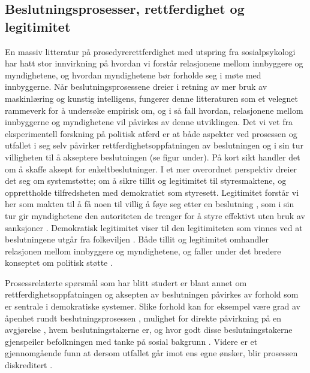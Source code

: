 \documentclass[
  12pt,
  a4paper, 12pt]{article}
\begin{document}
\hypertarget{beslutningsprosesser-rettferdighet-og-legitimitet}{%
\subsection{Beslutningsprosesser, rettferdighet og legitimitet}\label{beslutningsprosesser-rettferdighet-og-legitimitet}}

En massiv litteratur på prosedyrerettferdighet med utspring fra sosialpsykologi \citep{lind1988social} har hatt stor innvirkning på hvordan vi forstår relasjonene mellom innbyggere og myndighetene, og hvordan myndighetene bør forholde seg i møte med innbyggerne.
Når beslutningsprosessene dreier i retning av mer bruk av maskinlæring og kunstig intelligens, fungerer denne litteraturen som et velegnet rammeverk for å undersøke empirisk om, og i så fall hvordan, relasjonene mellom innbyggerne og myndighetene vil påvirkes av denne utviklingen.
Det vi vet fra eksperimentell forskning på politisk atferd er at både aspekter ved prosessen og utfallet i seg selv påvirker rettferdighetsoppfatningen av beslutningen og i sin tur villigheten til å akseptere beslutningen (se figur under).
På kort sikt handler det om å skaffe aksept for enkeltbeslutninger.
I et mer overordnet perspektiv dreier det seg om systemstøtte; om å sikre tillit og legitimitet til styresmaktene, og opprettholde tilfredsheten med demokratiet som styresett.
Legitimitet forstår vi her som makten til å få noen til villig å føye seg etter en beslutning \citep{weber2009theory}, som i sin tur gir myndighetene den autoriteten de trenger for å styre effektivt uten bruk av sanksjoner \citep{tyler2021people}.
Demokratisk legitimitet viser til den legitimiteten som vinnes ved at beslutningene utgår fra folkeviljen \citep{rosanvallon2011democratic}.
Både tillit og legitimitet omhandler relasjonen mellom innbyggere og myndighetene, og faller under det bredere konseptet om politisk støtte \citep{easton1965systems}.

Prosessrelaterte spørsmål som har blitt studert er blant annet om rettferdighetsoppfatningen og aksepten av beslutningen påvirkes av forhold som er sentrale i demokratiske systemer.
Slike forhold kan for eksempel være grad av åpenhet rundt beslutningsprosessen \citep{de2014does}, mulighet for direkte påvirkning på en avgjørelse \citep{EJPR:EJPR2052, arnesen2017legitimacy, christensen2020matter}, hvem beslutningstakerne er, og hvor godt disse beslutningstakerne gjenspeiler befolkningen med tanke på sosial bakgrunn \citep{arnesen2018legitimacy, clayton2019all}.
Videre er et gjennomgående funn at dersom utfallet går imot ens egne ønsker, blir prosessen diskreditert \citep{esaiasson2016reconsidering}.
\end{document}
